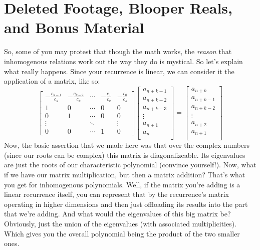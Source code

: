 \documentclass[12pt,letterpaper]{article}
\begin{document}
\section{Deleted Footage, Blooper Reals, and Bonus Material}
So, some of you may protest that though the math works, the \emph{reason} that
inhomogenous relations work out the way they do is mystical. So let's explain
what really happens. Since your recurrence is linear, we can consider it the
application of a matrix, like so:
$$
\left[ \begin{array}{ccccc}
-\frac{c_{k-1}}{c_k} & -\frac{c_{k-2}}{c_k} & \cdots &
-\frac{c_{1}}{c_k} & -\frac{c_{0}}{c_k} \\
1 & 0 & \cdots & 0 & 0 \\
0 & 1 & \cdots & 0 & 0 \\
\vdots && \ddots && \vdots \\
0 & 0 & \cdots & 1 & 0
\end{array} \right] \left[ \begin{array}{c}
a_{n+k-1} \\
a_{n+k-2} \\
a_{n+k-3} \\
\vdots \\
a_{n+1} \\
a_{n} \\
\end{array} \right] = \left[ \begin{array}{c}
a_{n+k} \\
a_{n+k-1} \\
a_{n+k-2} \\
\vdots \\
a_{n+2} \\
a_{n+1} \\
\end{array} \right]
$$
Now, the basic assertion that we made here was that over the complex numbers
(since our roots can be complex) this matrix is diagonalizeable. Its eigenvalues
are just the roots of our characteristic polynomial (convince yourself!). Now,
what if we have our matrix multiplication, but then a matrix addition? That's
what you get for inhomogenous polynomials. Well, if the matrix you're adding
is a linear recurrence itself, you can represent that by the recurrence's matrix
operating in higher dimensions and then just offloading its results into the part
that we're adding. And what would the eigenvalues of this big matrix be? Obviously,
just the union of the eigenvalues (with associated multiplicities). Which gives
you the overall polynomial being the product of the two smaller ones.
\end{document}
